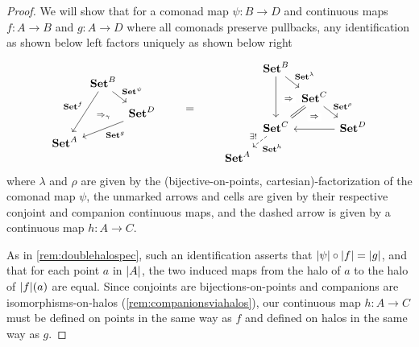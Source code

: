 \documentclass[11pt, oneside, article]{memoir}
\theoremstyle{plain}
\theoremstyle{definition}
\theoremstyle{remark}
\DeclarePairedDelimiter{\abs}{\lvert}{\rvert}
\newcommand{\bang}{\mathrm{!}}
\newcommand{\namedcat}[1]{\mathbf{#1}}
\newcommand{\Set}{\namedcat{Set}}
\newcommand{\CoalgOn}[2]{{#2}^{#1}}
\newcommand{\CoalgSet}[1]{\CoalgOn{#1}{\Set}}
\newcommand{\pts}[1]{{\abs{#1}}}
\newcommand{\one}[1]{\pts{#1}}
\newcommand{\com}[2]{{#1}^{#2}}
\newcommand{\con}[2]{{#1}^{#2}}
\newcommand{\cmnd}[1]{{#1}}
\newcommand{\cA}{\cmnd{A}}
\newcommand{\cB}{\cmnd{B}}
\newcommand{\cC}{\cmnd{C}}
\newcommand{\cD}{\cmnd{D}}
\newcommand{\ASet}{\CoalgSet{\cA}}
\newcommand{\BSet}{\CoalgSet{\cB}}
\newcommand{\CSet}{\CoalgSet{\cC}}
\newcommand{\DSet}{\CoalgSet{\cD}}
\begin{document}
\begin{proof}
  We will show that for a comonad map
  $\psi \colon \cB \to \cD$ and continuous maps $f \colon \cA \to \cB$
  and $g \colon \cA \to \cD$ where all comonads preserve pullbacks,
  any identification as shown below left factors uniquely as shown
  below right
  \[
    \begin{tikzcd}[column sep=2.5pt,row sep=10pt]
      & \BSet & \\
      && \DSet \\
      \ASet
      \arrow[""{name=0, anchor=center, inner sep=0}, "{\com{\Set}{\psi}}", from=1-2, to=2-3]
      \arrow["{\con{\Set}{f}}"', from=1-2, to=3-1]
      \arrow["{\con{\Set}{g}}", from=2-3, to=3-1]
      \arrow["{\Rightarrow_\gamma}"{anchor=center,pos=.55}, shift right=4pt, draw=none, from=3-1, to=0]
    \end{tikzcd}
    \qquad
    =
    \qquad
    \begin{tikzcd}[column sep=2.5pt,row sep=10pt]
      & \BSet && \\
      & {} & \CSet \\
      & \CSet & {} & \DSet \\
      \ASet
      \arrow["{\com{\Set}{\lambda}}", from=1-2, to=2-3]
      \arrow[from=1-2, to=3-2]
      \arrow["\Rightarrow"{description}, draw=none, from=2-3, to=2-2]
      \arrow[equals, from=2-3, to=3-2]
      \arrow["{\com{\Set}{\rho}}", from=2-3, to=3-4]
      \arrow["{\exists\bang}"', "{\con{\Set}{h}}", dashed, from=3-2, to=4-1]
      \arrow["\Rightarrow"{description}, draw=none, from=3-3, to=2-3]
      \arrow[from=3-4, to=3-2]
    \end{tikzcd}
  \]
  where $\lambda$ and $\rho$ are given by the (bijective-on-points,
  cartesian)-factorization of the comonad map $\psi$, the unmarked
  arrows and cells are given by their respective conjoint and
  companion continuous maps, and the dashed arrow is given by a
  continuous map $h \colon \cA \to \cC$.

  As in \cref{rem:doublehalospec}, such an identification asserts that
  $\one{\psi} \circ \one{f} = \one{g}$, and that for each point $a$ in
  $\pts{\cA}$, the two induced maps from the halo of $a$ to the halo
  of $\one{f}(a)$ are equal. Since conjoints are bijections-on-points
  and companions are isomorphisms-on-halos (\cref{rem:companionsviahalos}), 
  our continuous map
  $h \colon \cA \to \cC$ must be defined on points in the same way as
  $f$ and defined on halos in the same way as $g$. 
  

\end{proof}
\end{document}
